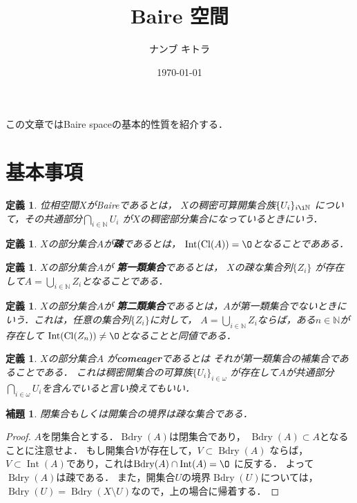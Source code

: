 \documentclass[leqno, 12pt]{jsarticle}
\title{Baire 空間}
\author{ナンブ キトラ}
\date{\today}
\newtheorem{lem}[thm]{補題}
\newtheorem{df}[thm]{定義}
\newcommand{\nn}{\mathbb{N}}
\DeclareMathOperator{\bd}{Bdry}
\DeclareMathOperator{\cl}{Cl}
\DeclareMathOperator{\nai}{Int}
\newcommand{\myom}{\omega}
\begin{document}
\maketitle
この文章ではBaire spaceの基本的性質を紹介する．




\section{基本事項}
\begin{df}
位相空間$X$がBaireであるとは，
$X$の稠密可算開集合族$\{U_i\}_{i\i \nn}$
について，その共通部分$\bigcap_{i\in \nn}U_i$
が$X$の稠密部分集合になっているときにいう．
\end{df}


\begin{df}
$X$の部分集合$A$が\textbf{疎}であるとは，
$\nai(\cl(A))=\O$となることであある．


\end{df}
\begin{df}
$X$の部分集合$A$が
\textbf{第一類集合}であるとは，
$X$の疎な集合列$\{Z_i\}$
が存在して$A=\bigcup_{i\in \nn}Z_i$となることである．
\end{df}

\begin{df}
$X$の部分集合$A$が
\textbf{第二類集合}であるとは，$A$が第一類集合でないときにいう．これは，任意の集合列$\{Z_i\}$に対して，
$A=\bigcup_{i\in \nn}Z_i$ならば，ある$n\in \nn$が存在して
$\nai(\cl(Z_n))\neq \O$となることと同値である．
\end{df}

\begin{df}
$X$の部分集合$A$
が\textbf{comeager}であるとは
それが第一類集合の補集合であることである．
これは稠密開集合の可算族$\{U_{i}\}_{i\in \myom}$
が存在して$A$が共通部分$\bigcap_{i\in \myom}U_{i}$を含んでいると言い換えてもいい．
\end{df}

\begin{lem}
閉集合もしくは開集合の境界は疎な集合である．
\end{lem}
\begin{proof}
$A$を閉集合とする．$\bd(A)$は閉集合であり，
$\bd(A)\subset A$となることに注意せよ．
もし開集合$V$が存在して，$V\subset \bd(A)$
ならば，$V\subset \nai(A)$であり，これは$\bd(A)\cap \nai(A)=\O$
に反する．
よって$\bd(A)$は疎である．
また，開集合$U$の境界$\bd(U)$については，
$\bd(U)=\bd(X\setminus U)$なので，上の場合に帰着する．
\end{proof}
\end{document}
